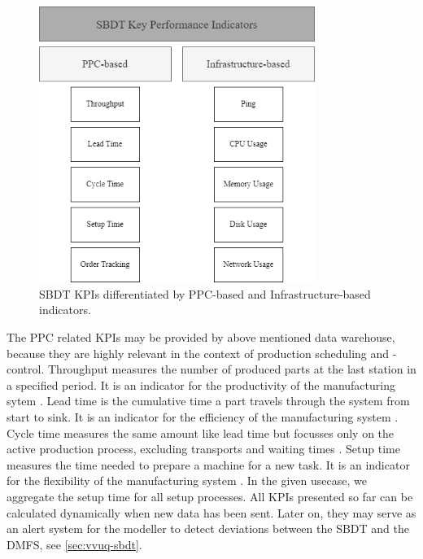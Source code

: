 \begin{figure}[htbp]
  \centering
  \includegraphics[width=0.8\textwidth]{figures/kpi.png}
  \caption{SBDT KPIs differentiated by PPC-based and Infrastructure-based indicators.}
  \label{fig:kpis}
\end{figure}

The PPC related KPIs may be provided by above mentioned data warehouse, because they are highly relevant in the context of production scheduling and -control. Throughput measures the number of produced parts at the last station in a specified period. It is an indicator for the productivity of the manufacturing sytem \parencite{imseitif2019throughput}. Lead time is the cumulative time a part travels through the system from start to sink. It is an indicator for the efficiency of the manufacturing system \parencite{pfeiffer2016manufacturing}. Cycle time measures the same amount like lead time but focusses only on the active production process, excluding transports and waiting times \parencite{griffin1993metrics}. Setup time measures the time needed to prepare a machine for a new task. It is an indicator for the flexibility of the manufacturing system \parencite{allahverdi2008significance}. In the given usecase, we aggregate the setup time for all setup processes. All KPIs presented so far can be calculated dynamically when new data has been sent. Later on, they may serve as an alert system for the modeller to detect deviations between the SBDT and the DMFS, see \autoref{sec:vvuq-sbdt}.

